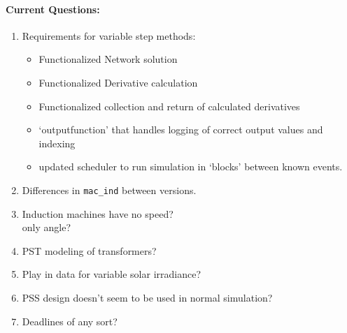 \documentclass[12pt]{article}
\begin{document}
\begin{multicols}{2}
\paragraph{Current Questions:}
	\begin{enumerate}
	\itemsep0em 
	\item Requirements for variable step methods:
		\begin{minipage}{\linewidth}
			\begin{itemize}
				\itemsep0em 
				\footnotesize
				\item Functionalized Network solution
				\item Functionalized Derivative calculation
				\item Functionalized collection and return of calculated derivatives
				\item `outputfunction' that handles logging of correct output values and indexing
				\item updated scheduler to run simulation in `blocks' between known events.
			\end{itemize}
		\end{minipage}
		\item Differences in \verb|mac_ind| between versions.
	\item Induction machines have no speed?\\ only angle?
	\item PST modeling of transformers?
	\item Play in data for variable solar irradiance?
	\item PSS design doesn't seem to be used in normal simulation?
	\item Deadlines of any sort?
	\end{enumerate}

\vfill\null
\columnbreak

	

\end{multicols}
\end{document}
